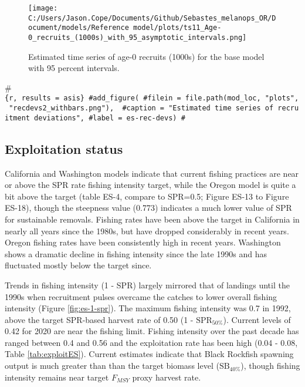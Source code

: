 \documentclass[11pt,
  english,
  letterpaper,
]{article}
\begin{document}


\begin{figure}
\centering
\texttt{[image: C:/Users/Jason.Cope/Documents/Github/Sebastes\_melanops\_OR/Document/models/Reference model/plots/ts11\_Age-0\_recruits\_(1000s)\_with\_95\_asymptotic\_intervals.png]}
\caption{Estimated time series of age-0 recruits (1000s) for the base model with 95 percent intervals.\label{fig:es-recruits}}
\end{figure}

\#\texttt{\{r,\ results\ =\ \textquotesingle{}asis\textquotesingle{}\}\ \#add\_figure(\ \#filein\ =\ file.path(mod\_loc,\ "plots",\ "recdevs2\_withbars.png"),\ \ \#caption\ =\ "Estimated\ time\ series\ of\ recruitment\ deviations",\ \#label\ =\ \textquotesingle{}es-rec-devs\textquotesingle{})\ \#}

\hypertarget{exploitation-status}{%
\subsection*{Exploitation status}\label{exploitation-status}}

California and Washington models indicate that current fishing practices are near or above the SPR rate fishing intensity target, while the Oregon model is quite a bit above the target (table ES-4, compare to SPR=0.5; Figure ES-13 to Figure ES-18), though the steepness value (0.773) indicates a much lower value of SPR for sustainable removals. Fishing rates have been above the target in California in nearly all years since the 1980s, but have dropped considerably in recent years. Oregon fishing rates have been consistently high in recent years. Washington shows a dramatic decline in fishing intensity since the late 1990s and has fluctuated mostly below the target since.

Trends in fishing intensity (1 - SPR) largely mirrored that of landings until the 1990s when recruitment pulses overcame the catches to lower overall fishing intensity (Figure \ref{fig:es-1-spr}). The maximum fishing intensity was 0.7 in 1992, above the target SPR-based harvest rate of 0.50 (1 - \(\text{SPR}_{50\%}\)). Current levels of 0.42 for 2020 are near the fishing limit. Fishing intensity over the past decade has ranged between 0.4 and 0.56 and the exploitation rate has been high (0.04 - 0.08, Table \ref{tab:exploitES}). Current estimates indicate that Black Rockfish spawning output is much greater than than the target biomass level (\(\text{SB}_{40\%}\)), though fishing intensity remains near target \(F_{MSY}\) proxy harvest rate.
\end{document}
